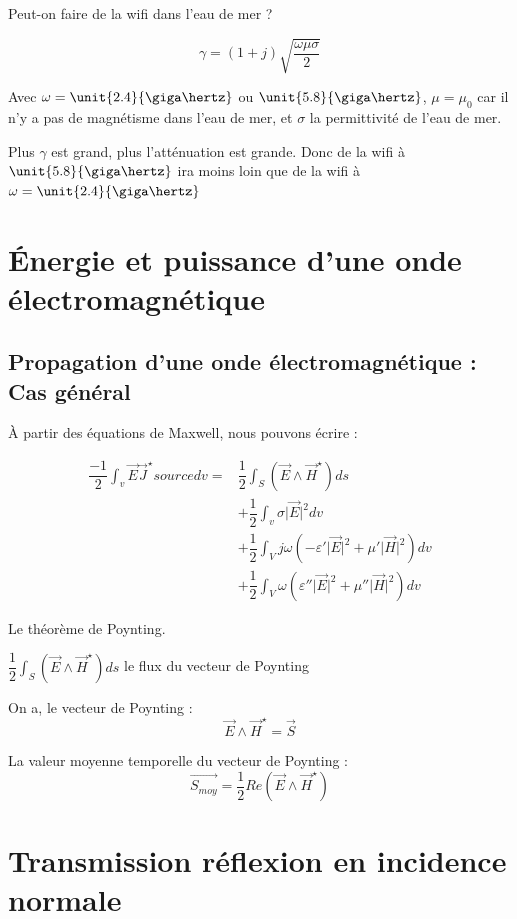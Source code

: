 \documentclass[12pt,a4paper]{report}
\begin{document}
Peut-on faire de la wifi dans l'eau de mer ?

\[
	\gamma = (1+j) \sqrt{\dfrac{\omega \mu \sigma}{2}}
\]

Avec \(\omega = \unit{2.4}{\giga\hertz}\) ou \(\unit{5.8}{\giga\hertz}\), \(\mu = \mu_0\) car il n'y a pas de magnétisme dans l'eau de mer, et \(\sigma\) la permittivité de l'eau de mer.

Plus \(\gamma\) est grand, plus l'atténuation est grande. Donc de la wifi à \(\unit{5.8}{\giga\hertz}\) ira moins loin que de la wifi à \(\omega = \unit{2.4}{\giga\hertz}\)

\section{Énergie et puissance d'une onde électromagnétique}

\subsection{Propagation d'une onde électromagnétique : Cas général}

À partir des équations de Maxwell, nous pouvons écrire :

\begin{align*}
	\dfrac{-1}{2} \int_v \vec{E}\vec{J}^\star source dv = & \dfrac{1}{2}\int_S ( \vec{E} \wedge \vec{H}^\star) ds\\
	& + \dfrac{1}{2} \int_v \sigma \vert \vec{E} \vert ^2 dv\\
	& + \dfrac{1}{2} \int_V j\omega \left( -\varepsilon' \vert \vec{E} \vert ^2 + \mu' \vert \vec{H} \vert ^2 \right) dv\\
	& + \dfrac{1}{2} \int_V \omega \left( \varepsilon'' \vert \vec{E} \vert ^2 + \mu'' \vert \vec{H} \vert ^2 \right) dv
\end{align*}

Le théorème de Poynting.

\(\dfrac{1}{2}\int_S ( \vec{E} \wedge \vec{H}^\star) ds\) le flux du vecteur de Poynting

On a, le vecteur de Poynting :
\[
	\vec{E} \wedge \vec{H}^\star = \vec{S}
\]

La valeur moyenne temporelle du vecteur de Poynting :
\[
	\vec{S_{moy}} = \dfrac{1}{2}Re(\vec{E} \wedge \vec{H}^\star)
\]

\section{Transmission réflexion en incidence normale}
\end{document}
